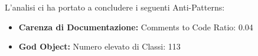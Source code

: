 L'analisi ci ha portato a concludere i seguenti Anti-Patterns:
    \begin{itemize}
        \item \textbf{Carenza di Documentazione:} Comments to Code Ratio: 0.04
        \item \textbf{God Object:} Numero elevato di Classi: 113
    \end{itemize}

